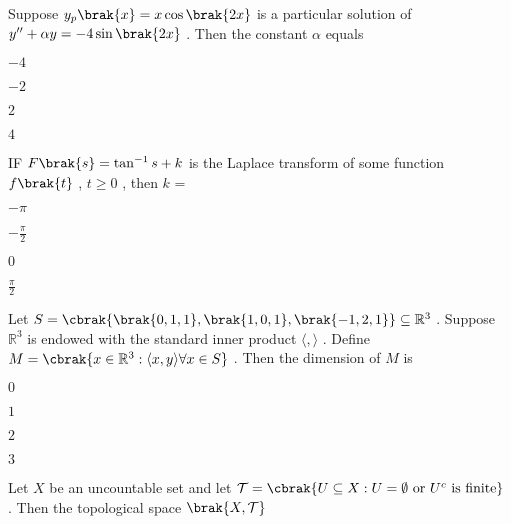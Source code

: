 \iffalse
\title{MA-2007-18-34}
\author{EE24BTECH11036 - Krishna Patil}
\section{ma}
\chapter{2007}
\fi
\item Suppose $ y_p\brak{x}=x\cos\brak{2x} $ is a particular solution of $ y^{\prime\prime} + \alpha y = -4\sin\brak{2x} $ . Then the constant $\alpha$ equals
\begin{enumerate}
\begin{multicols}{2}
\item $ -4 $
\item $ -2 $
\item $ 2 $
\item $ 4 $
\end{multicols}
\end{enumerate}
\item IF $ F\brak{s} = \tan^{-1}{s} + k $ is the Laplace transform of some function $ f\brak{t} $ , $ t \geq 0 $ , then $ k $ = 
\begin{enumerate}
\begin{multicols}{2}
\item $ -\pi $
\item $-\frac{\pi}{2} $ 
\item $ 0 $
\item $ \frac{\pi}{2} $
\end{multicols}
\end{enumerate}
\item Let $ S = \cbrak{\brak{0,1,1},\brak{1,0,1},\brak{-1,2,1}} \subseteq \mathbb{R}^3 $ . Suppose $ \mathbb{R}^3 $ is endowed with the standard inner product $ \langle  , \rangle $ . Define $ M  = \cbrak{  x \in \mathbb{R}^3 : {\langle x,y \rangle} \forall x \in S } $ . Then the dimension of $ M $ is 
\begin{enumerate}
\begin{multicols}{2}
\item $ 0 $
\item $ 1 $ 
\item $ 2 $
\item $ 3 $
\end{multicols}
\end{enumerate}
\item Let $X$ be an uncountable set and let
$ \mathcal{T} = \cbrak{ U \subseteq X : U = \emptyset \text{ or } U^c \text{ is finite} } $ . Then the topological space $\brak{X, \mathcal{T}}$
